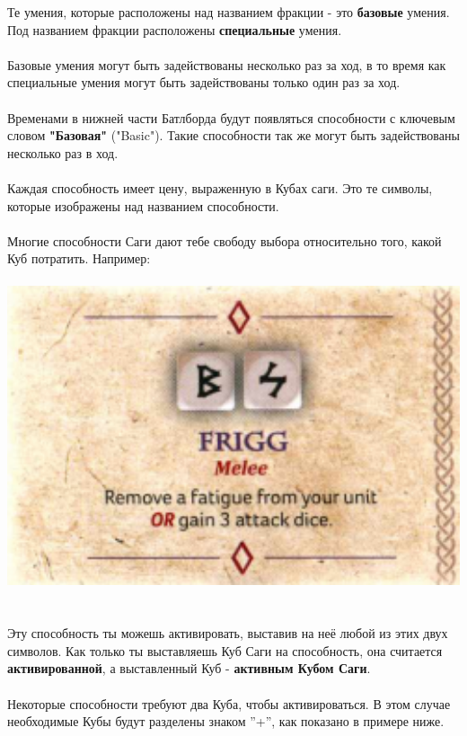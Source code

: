 \documentclass[a4paper,11pt,twoside]{article}
\begin{document}
Те умения, которые расположены над названием фракции - это \textbf{базовые} умения. Под названием фракции расположены \textbf{специальные} умения. \\ \\ 
Базовые умения могут быть задействованы несколько раз за ход, в то время как специальные умения могут быть задействованы только один раз за ход. \\ \\ 
Временами в нижней части Батлборда будут появляться способности с ключевым словом \textbf{"Базовая"} ("Basic"). Такие способности так же могут быть задействованы несколько раз в ход. \\ \\ 
Каждая способность имеет цену, выраженную в Кубах саги. Это те символы, которые изображены над названием способности. \\ \\ 
Многие способности Саги дают тебе свободу выбора относительно того, какой Куб потратить. Например: \\ \\
\includegraphics[width=1.0\textwidth]{pics/SagaSeveralDiceAbility} \\ \\ \\
Эту способность ты можешь активировать, выставив на неё любой из этих двух символов. Как только ты выставляешь Куб Саги на способность, она считается \textbf{активированной}, а выставленный Куб - \textbf{активным Кубом Саги}. \\ \\ 
Некоторые способности требуют два Куба, чтобы активироваться. В этом случае необходимые Кубы будут разделены знаком ''+'', как показано в примере ниже. \\ \\
\end{document}
